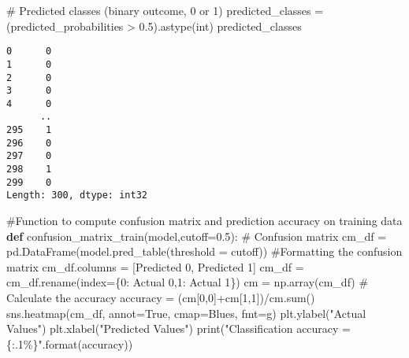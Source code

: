 \documentclass[
  letterpaper,
  DIV=11,
  numbers=noendperiod]{scrreprt}
\newenvironment{Shaded}{\begin{snugshade}}{\end{snugshade}}
\newcommand{\BuiltInTok}[1]{\textcolor[rgb]{0.00,0.23,0.31}{#1}}
\newcommand{\CommentTok}[1]{\textcolor[rgb]{0.37,0.37,0.37}{#1}}
\newcommand{\DecValTok}[1]{\textcolor[rgb]{0.68,0.00,0.00}{#1}}
\newcommand{\FloatTok}[1]{\textcolor[rgb]{0.68,0.00,0.00}{#1}}
\newcommand{\KeywordTok}[1]{\textcolor[rgb]{0.00,0.23,0.31}{\textbf{#1}}}
\newcommand{\NormalTok}[1]{\textcolor[rgb]{0.00,0.23,0.31}{#1}}
\newcommand{\OperatorTok}[1]{\textcolor[rgb]{0.37,0.37,0.37}{#1}}
\newcommand{\SpecialCharTok}[1]{\textcolor[rgb]{0.37,0.37,0.37}{#1}}
\newcommand{\StringTok}[1]{\textcolor[rgb]{0.13,0.47,0.30}{#1}}
\newcommand{\VariableTok}[1]{\textcolor[rgb]{0.07,0.07,0.07}{#1}}
\begin{document}
\begin{Shaded}
\begin{Highlighting}[]
\CommentTok{\# Predicted classes (binary outcome, 0 or 1)}
\NormalTok{predicted\_classes }\OperatorTok{=}\NormalTok{ (predicted\_probabilities }\OperatorTok{\textgreater{}} \FloatTok{0.5}\NormalTok{).astype(}\BuiltInTok{int}\NormalTok{)}
\NormalTok{predicted\_classes}
\end{Highlighting}
\end{Shaded}

\begin{verbatim}
0      0
1      0
2      0
3      0
4      0
      ..
295    1
296    0
297    0
298    1
299    0
Length: 300, dtype: int32
\end{verbatim}

\begin{Shaded}
\begin{Highlighting}[]
\CommentTok{\#Function to compute confusion matrix and prediction accuracy on training data}
\KeywordTok{def}\NormalTok{ confusion\_matrix\_train(model,cutoff}\OperatorTok{=}\FloatTok{0.5}\NormalTok{):}
    \CommentTok{\# Confusion matrix}
\NormalTok{    cm\_df }\OperatorTok{=}\NormalTok{ pd.DataFrame(model.pred\_table(threshold }\OperatorTok{=}\NormalTok{ cutoff))}
    \CommentTok{\#Formatting the confusion matrix}
\NormalTok{    cm\_df.columns }\OperatorTok{=}\NormalTok{ [}\StringTok{\textquotesingle{}Predicted 0\textquotesingle{}}\NormalTok{, }\StringTok{\textquotesingle{}Predicted 1\textquotesingle{}}\NormalTok{] }
\NormalTok{    cm\_df }\OperatorTok{=}\NormalTok{ cm\_df.rename(index}\OperatorTok{=}\NormalTok{\{}\DecValTok{0}\NormalTok{: }\StringTok{\textquotesingle{}Actual 0\textquotesingle{}}\NormalTok{,}\DecValTok{1}\NormalTok{: }\StringTok{\textquotesingle{}Actual 1\textquotesingle{}}\NormalTok{\})}
\NormalTok{    cm }\OperatorTok{=}\NormalTok{ np.array(cm\_df)}
    \CommentTok{\# Calculate the accuracy}
\NormalTok{    accuracy }\OperatorTok{=}\NormalTok{ (cm[}\DecValTok{0}\NormalTok{,}\DecValTok{0}\NormalTok{]}\OperatorTok{+}\NormalTok{cm[}\DecValTok{1}\NormalTok{,}\DecValTok{1}\NormalTok{])}\OperatorTok{/}\NormalTok{cm.}\BuiltInTok{sum}\NormalTok{()}
\NormalTok{    sns.heatmap(cm\_df, annot}\OperatorTok{=}\VariableTok{True}\NormalTok{, cmap}\OperatorTok{=}\StringTok{\textquotesingle{}Blues\textquotesingle{}}\NormalTok{, fmt}\OperatorTok{=}\StringTok{\textquotesingle{}g\textquotesingle{}}\NormalTok{)}
\NormalTok{    plt.ylabel(}\StringTok{"Actual Values"}\NormalTok{)}
\NormalTok{    plt.xlabel(}\StringTok{"Predicted Values"}\NormalTok{)}
    \BuiltInTok{print}\NormalTok{(}\StringTok{"Classification accuracy = }\SpecialCharTok{\{:.1\%\}}\StringTok{"}\NormalTok{.}\BuiltInTok{format}\NormalTok{(accuracy))}
\end{Highlighting}
\end{Shaded}
\end{document}

